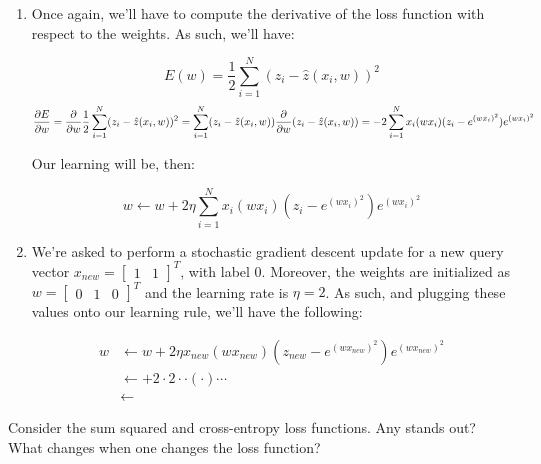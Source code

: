 \documentclass[12pt]{article}
\begin{document}
\begin{enumerate}[leftmargin=\labelsep]
  \begin{enumerate}
    \item {
          Once again, we'll have to compute the derivative of the loss function with
          respect to the weights. As such, we'll have:

          $$
            E(w) = \frac{1}{2} \sum_{i=1}^N (z_i - \hat{z}(x_i, w))^2
          $$
          $$
            \frac{\partial E}{\partial w} = \frac{\partial}{\partial w} \frac{1}{2} \sum_{i=1}^N (z_i - \hat{z}(x_i, w))^2 \\
            = \sum_{i=1}^N (z_i - \hat{z}(x_i, w)) \frac{\partial}{\partial w} (z_i - \hat{z}(x_i, w))
            = -2 \sum_{i=1}^N x_i (w x_i) (z_i - e^{(w x_i)^2}) e^{(w x_i)^2}
          $$

          Our learning will be, then:

          $$
            w \leftarrow w + 2\eta \sum_{i=1}^N x_i (w x_i) (z_i - e^{(w x_i)^2}) e^{(w x_i)^2}
          $$
          }
    \item {
          We're asked to perform a stochastic gradient descent update for a new query
          vector $x_{new} = \begin{bmatrix}1 & 1\end{bmatrix}^T$, with label $0$.
          Moreover, the weights are initialized as $w = \begin{bmatrix}0 & 1 & 0\end{bmatrix}^T$
          and the learning rate is $\eta = 2$. As such, and plugging these values
          onto our learning rule, we'll have the following:

          \begin{align*}
            w & \leftarrow w + 2\eta x_{new} (w x_{new}) (z_{new} - e^{(w x_{new})^2}) e^{(w x_{new})^2} \\
              & \leftarrow  + 2 \cdot 2 \cdot
             \cdot \left(
             \cdot 
            \right) \cdots                                                                               \\
              & \leftarrow 
          \end{align*}

          }
  \end{enumerate}

  \begin{tcolorbox}[enhanced jigsaw,colback=bg,boxrule=0pt,arc=1pt,halign=center]
    \item Consider the sum squared and cross-entropy loss functions. Any stands out?
    What changes when one changes the loss function?
  \end{tcolorbox}


\end{enumerate}
\end{document}
